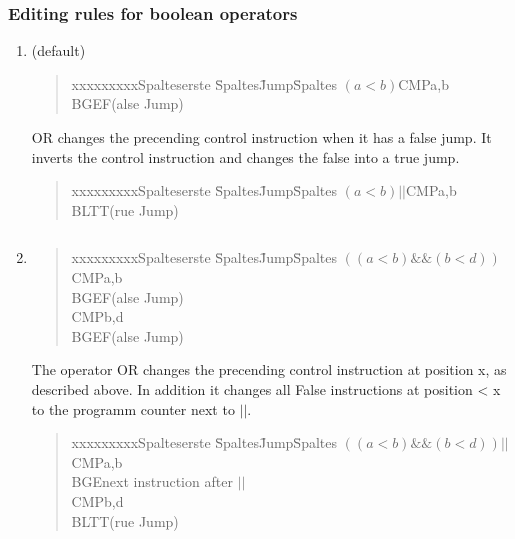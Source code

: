 \subsubsection{Editing rules for boolean operators}
\begin{enumerate}
  \item (default)
  \begin{quote}
	\begin{tabbing}
	xxxxxxxxxSpalteserste \= Spaltes\=  Jump\= Spaltes \kill
	$(a<b)$\>CMP\>a,b\\
	\>BGE\>\>F(alse Jump)\\
	\end{tabbing}
	\end{quote}
OR changes the precending control instruction when it has a false jump. 
It inverts the control instruction and changes the false into a true
  jump.
    \begin{quote}
	\begin{tabbing}
	xxxxxxxxxSpalteserste \= Spaltes\=  Jump\= Spaltes \kill
	$(a<b) || $\>CMP\>a,b\\
	\>BLT\>\>T(rue Jump)\\
	\end{tabbing}
	\end{quote}
\begin{verbatim}

\end{verbatim}
    \item
    
  \begin{quote}
	\begin{tabbing}
	xxxxxxxxxSpalteserste \= Spaltes\=  Jump\= Spaltes \kill
	$((a<b) \&\&  (b<d))$\>CMP\>a,b\\
	\>BGE\>\>F(alse Jump)\\
	\>CMP\>b,d\\
	\>BGE\>\>F(alse Jump)\\
	\end{tabbing}
	\end{quote}
      The operator OR changes the precending control instruction at position x, as described above. In addition it changes all False
      instructions at position < x to the programm counter next to $||$.  
  \begin{quote}
	\begin{tabbing}
	xxxxxxxxxSpalteserste \= Spaltes\=  Jump\= Spaltes \kill
	$((a<b) \&\&  (b<d))||$\>CMP\>a,b\\
	\>BGE\>\>next instruction after $||$\\
	\>CMP\>b,d\\
	\>BLT\>\>T(rue Jump)\\
	\end{tabbing}
	\end{quote}
\begin{verbatim}


\end{verbatim}
\end{enumerate}
